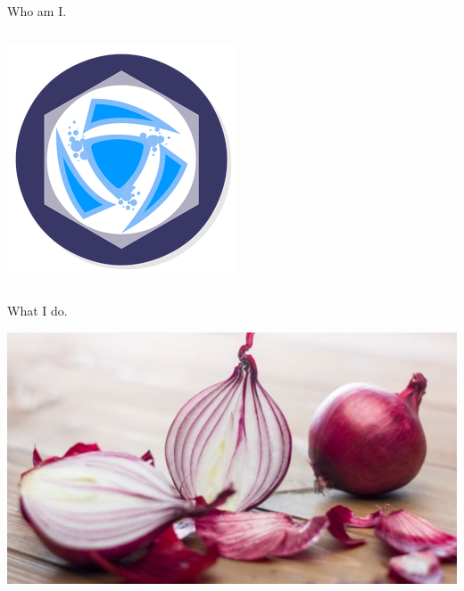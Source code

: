 \documentclass{beamer}
\begin{document}
\begin{frame}{Who am I.}
\begin{columns}[T]
\begin{column}{.2\textwidth}
  		\includegraphics[width=\textwidth]{static/hots_logo.jpg}
\end{column}%
\end{columns}
\end{frame}

\begin{frame}{What I do.}
    \begin{center}
        \includegraphics[width=.80\textwidth]{static/onion.jpg}
    \end{center}
\end{frame}
\end{document}
